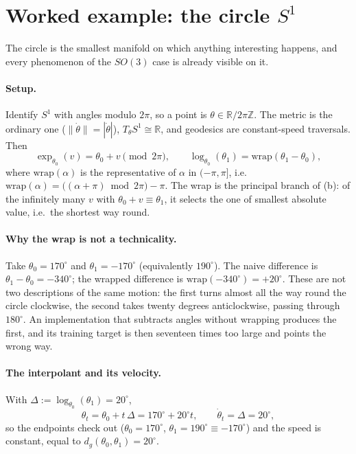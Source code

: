 \documentclass[11pt,a4paper]{report}
\theoremstyle{definition}
\theoremstyle{remark}
\newcommand{\RR}{\mathbb R}
\newcommand{\ZZ}{\mathbb Z}
\begin{document}
\section{Worked example: the circle $S^1$}
\label{sec:rfm-s1}

The circle is the smallest manifold on which anything interesting happens,
and every phenomenon of the $SO(3)$ case is already visible on it.

\paragraph{Setup.} Identify $S^1$ with angles modulo $2\pi$, so a point is
$\theta\in\RR/2\pi\ZZ$. The metric is the ordinary one ($\|\dot\theta\|=|\dot\theta|$),
$T_\theta S^1\cong\RR$, and geodesics are constant-speed traversals. Then
\[
\exp_{\theta_0}(v) = \theta_0+v \pmod{2\pi},
\qquad
\log_{\theta_0}(\theta_1) = \mathrm{wrap}(\theta_1-\theta_0) ,
\]
where $\mathrm{wrap}(\alpha)$ is the representative of $\alpha$ in
$(-\pi,\pi]$, i.e.\ $\mathrm{wrap}(\alpha)=\bigl((\alpha+\pi)\bmod2\pi\bigr)-\pi$.
The wrap is the principal branch of (b): of the
infinitely many $v$ with $\theta_0+v\equiv\theta_1$, it selects the one of
smallest absolute value, i.e.\ the shortest way round.

\paragraph{Why the wrap is not a technicality.} Take
$\theta_0=170^\circ$ and $\theta_1=-170^\circ$ (equivalently $190^\circ$).
The naive difference is $\theta_1-\theta_0=-340^\circ$; the wrapped
difference is $\mathrm{wrap}(-340^\circ)=+20^\circ$. These are not two
descriptions of the same motion: the first turns almost all the way round
the circle clockwise, the second takes twenty degrees anticlockwise, passing
through $180^\circ$. An implementation that subtracts angles without
wrapping produces the first, and its training target is then seventeen times
too large and points the wrong way.

\paragraph{The interpolant and its velocity.} With
$\Delta:=\log_{\theta_0}(\theta_1)=20^\circ$,
\[
\theta_t = \theta_0 + t\,\Delta = 170^\circ + 20^\circ t ,
\qquad
\dot\theta_t = \Delta = 20^\circ ,
\]
so the endpoints check out ($\theta_0=170^\circ$, $\theta_1=190^\circ\equiv-170^\circ$)
and the speed is constant, equal to $d_g(\theta_0,\theta_1)=20^\circ$.
\end{document}
